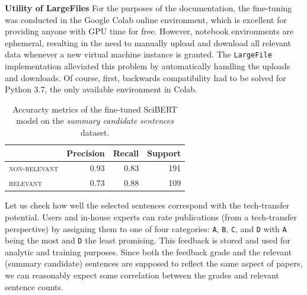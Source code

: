 \begin{displayquote}
\textbf{Utility of LargeFiles} For the purposes of the documentation, the fine-tuning was conducted in the Google Colab online environment, which is excellent for providing anyone with GPU time for free. However, notebook environments are ephemeral, resulting in the need to manually upload and download all relevant data whenever a new virtual machine instance is granted. The \texttt{LargeFile} implementation alleviated this problem by automatically handling the uploads and downloads. Of course, first, backwards compatibility had to be solved for Python 3.7, the only available environment in Colab.
\end{displayquote}

\begin{table}[ht]
    \centering
    \begin{threeparttable}
    \caption{Accuracty metrics of the fine-tuned SciBERT model on the \textit{summary candidate sentences} dataset.}
    \label{table:scibert-pr}
    \setlength{\tabcolsep}{0.75em} %
    {\renewcommand{\arraystretch}{1.2} %
    \begin{tabular}{|l|r|r|r|}
    \hline
    {}                    & \textbf{Precision}  & \textbf{Recall}  & \textbf{Support} \\\hline
    \textsc{non-relevant} &      0.93           &     0.83         &      191         \\\hline
    \textsc{relevant}     &      0.73           &     0.88         &      109         \\\hline
    \end{tabular}}
    \end{threeparttable}
\end{table}

Let us check how well the selected sentences correspond with the tech-transfer potential. Users and in-house experts can rate publications (from a tech-transfer perspective) by assigning them to one of four categories: \texttt{A}, \texttt{B}, \texttt{C}, and \texttt{D} with \texttt{A} being the most and \texttt{D} the least promising. This feedback is stored and used for analytic and training purposes. Since both the feedback grade and the relevant (summary candidate) sentences are supposed to reflect the same aspect of papers, we can reasonably expect some correlation between the grades and relevant sentence counts.

